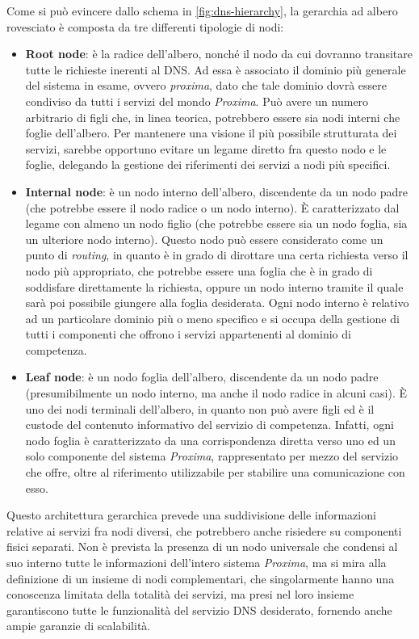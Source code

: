 \documentclass[a4paper,12pt]{report}
\begin{document}
Come si può evincere dallo schema in \autoref{fig:dns-hierarchy}, la gerarchia ad albero rovesciato è composta da tre differenti tipologie di nodi:
\begin{itemize}
	\item \textbf{Root node}: è la radice dell'albero, nonché il nodo da cui dovranno transitare tutte le richieste inerenti al DNS. Ad essa è associato il dominio più generale del sistema in esame, ovvero \emph{proxima}, dato che tale dominio dovrà essere condiviso da tutti i servizi del mondo \emph{Proxima}. Può avere un numero arbitrario di figli che, in linea teorica, potrebbero essere sia nodi interni che foglie dell'albero. Per mantenere una visione il più possibile strutturata dei servizi, sarebbe opportuno evitare un legame diretto fra questo nodo e le foglie, delegando la gestione dei riferimenti dei servizi a nodi più specifici.
	\item \textbf{Internal node}: è un nodo interno dell'albero, discendente da un nodo padre (che potrebbe essere il nodo radice o un nodo interno). È caratterizzato dal legame con almeno un nodo figlio (che potrebbe essere sia un nodo foglia, sia un ulteriore nodo interno). Questo nodo può essere considerato come un punto di \emph{routing}, in quanto è in grado di dirottare una certa richiesta verso il nodo più appropriato, che potrebbe essere una foglia che è in grado di soddisfare direttamente la richiesta, oppure un nodo interno tramite il quale sarà poi possibile giungere alla foglia desiderata. Ogni nodo interno è relativo ad un particolare dominio più o meno specifico e si occupa della gestione di tutti i componenti che offrono i servizi appartenenti al dominio di competenza.
	\item \textbf{Leaf node}: è un nodo foglia dell'albero, discendente da un nodo padre (presumibilmente un nodo interno, ma anche il nodo radice in alcuni casi). È uno dei nodi terminali dell'albero, in quanto non può avere figli ed è il custode del contenuto informativo del servizio di competenza. Infatti, ogni nodo foglia è caratterizzato da una corrispondenza diretta verso uno ed un solo componente del sistema \emph{Proxima}, rappresentato per mezzo del servizio che offre, oltre al riferimento utilizzabile per stabilire una comunicazione con esso.
\end{itemize}

Questo architettura gerarchica prevede una suddivisione delle informazioni relative ai servizi fra nodi diversi, che potrebbero anche risiedere su componenti fisici separati. Non è prevista la presenza di un nodo universale che condensi al suo interno tutte le informazioni dell'intero sistema \emph{Proxima}, ma si mira alla definizione di un insieme di nodi complementari, che singolarmente hanno una conoscenza limitata della totalità dei servizi, ma presi nel loro insieme garantiscono tutte le funzionalità del servizio DNS desiderato, fornendo anche ampie garanzie di scalabilità.
\end{document}
